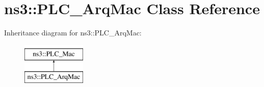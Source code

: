 \hypertarget{classns3_1_1PLC__ArqMac}{\section{ns3\-:\-:\-P\-L\-C\-\_\-\-Arq\-Mac \-Class \-Reference}
\label{classns3_1_1PLC__ArqMac}
}
\-Inheritance diagram for ns3\-:\-:\-P\-L\-C\-\_\-\-Arq\-Mac\-:\begin{figure}[H]
\begin{center}
\leavevmode
\includegraphics[height=2.000000cm]{classns3_1_1PLC__ArqMac}
\end{center}
\end{figure}
